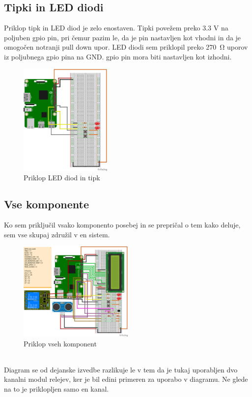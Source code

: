 \documentclass[11pt]{article}
\begin{document}
\subsection{Tipki in LED diodi}
Priklop tipk in LED diod je zelo enostaven. Tipki povežem preko 3.3 V na poljuben \gls{gpio} pin, pri čemur pazim le, da je pin nastavljen kot vhodni in da je omogočen notranji pull down upor.
LED diodi sem priklopil preko \SI{270}{\ohm} uporov iz poljubnega \gls{gpio} pina na GND. \gls{gpio} pin mora biti nastavljen kot izhodni.
\begin{figure}[h]
\centering
\includegraphics[width=0.4\textwidth]{images/smartGarage_LED_button_bb.png}
\caption{Priklop LED diod in tipk}
\end{figure}

\subsection{Vse komponente}
Ko sem priključil vsako komponento posebej in se prepričal o tem kako deluje, sem vse skupaj združil v en sistem.
\begin{figure}[h]
\centering
\includegraphics[width=0.5\textwidth]{images/smartGarageComplete_bb.png}
\caption{Priklop vseh komponent}
\end{figure}\\
Diagram se od dejanske izvedbe razlikuje le v tem da je tukaj uporabljen dvo kanalni modul relejev, ker je bil edini primeren za uporabo v diagramu. Ne glede na to je priklopljen samo en kanal.
\end{document}

